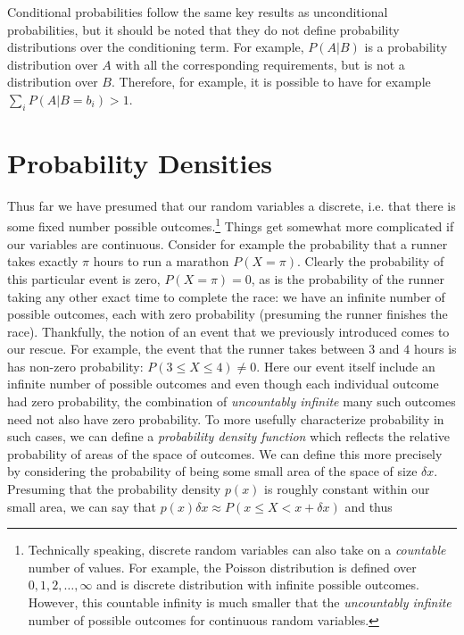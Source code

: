 Conditional probabilities follow  the same key results as unconditional probabilities, but it 
should be noted that they do not define probability distributions over the conditioning term.  
For example, $P(A|B)$ is a probability distribution over $A$ with all the corresponding 
requirements, but is not a distribution over $B$.  Therefore,
for example, it is possible to have for example $\sum_{i} P(A|B=b_i) >1$.

\section{Probability Densities}
\label{sec:prob:den}

Thus far we have presumed that our random variables a discrete, i.e. that there is some fixed
number possible outcomes.\footnote{Technically speaking, discrete random variables can also
	take on a \emph{countable} number of values.  For example, the Poisson distribution is defined
	over $0,1,2,\dots,\infty$ and is discrete distribution with infinite possible outcomes.  
	However, this countable infinity is much smaller that the \emph{uncountably infinite} number
	of possible outcomes for continuous random variables.}
Things get somewhat more complicated if our variables are continuous.  Consider for example
the probability that a runner takes exactly $\pi$ hours to run a marathon $P(X=\pi)$.  
Clearly the probability
of this particular event is zero, $P(X=\pi)=0$, as is the probability of the runner taking any other exact time
to complete the race: we have an infinite number of possible outcomes, each with zero probability
(presuming the runner finishes the race).  Thankfully, the notion of an event that we previously
introduced comes to our rescue.  For example, the event that the runner takes between $3$ and
$4$ hours is has non-zero probability: $P(3\le X \le 4) \neq 0$.  Here our event itself include
an infinite number of possible outcomes and even though each individual outcome had
zero probability, the combination of \emph{uncountably infinite} many such outcomes need
not also have zero probability.  To more usefully characterize probability in such cases, we can
define a \emph{probability density function} which reflects the relative probability of areas of
the space of outcomes.  We can define this more precisely by considering the probability
of being some small area of the space of size $\delta x$.  Presuming that the probability density
$p(x)$ is roughly constant within our small area, we can say that 
$p(x)\delta x \approx P(x\le X <x+\delta x)$ and thus 
